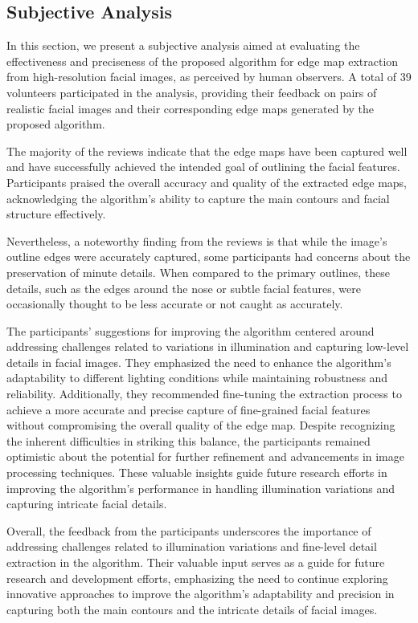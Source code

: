 \documentclass{70_styles/svproc}
\begin{document}
\subsection{Subjective Analysis}

In this section, we present a subjective analysis aimed at evaluating the effectiveness and preciseness of the proposed algorithm for edge map extraction from high-resolution facial images, as perceived by human observers. A total of 39 volunteers participated in the analysis, providing their feedback on pairs of realistic facial images and their corresponding edge maps generated by the proposed algorithm.

The majority of the reviews indicate that the edge maps have been captured well and have successfully achieved the intended goal of outlining the facial features. Participants praised the overall accuracy and quality of the extracted edge maps, acknowledging the algorithm's ability to capture the main contours and facial structure effectively.

Nevertheless, a noteworthy finding from the reviews is that while the image's outline edges were accurately captured, some participants had concerns about the preservation of minute details. When compared to the primary outlines, these details, such as the edges around the nose or subtle facial features, were occasionally thought to be less accurate or not caught as accurately.

The participants' suggestions for improving the algorithm centered around addressing challenges related to variations in illumination and capturing low-level details in facial images. They emphasized the need to enhance the algorithm's adaptability to different lighting conditions while maintaining robustness and reliability. Additionally, they recommended fine-tuning the extraction process to achieve a more accurate and precise capture of fine-grained facial features without compromising the overall quality of the edge map. Despite recognizing the inherent difficulties in striking this balance, the participants remained optimistic about the potential for further refinement and advancements in image processing techniques. These valuable insights guide future research efforts in improving the algorithm's performance in handling illumination variations and capturing intricate facial details.

Overall, the feedback from the participants underscores the importance of addressing challenges related to illumination variations and fine-level detail extraction in the algorithm. Their valuable input serves as a guide for future research and development efforts, emphasizing the need to continue exploring innovative approaches to improve the algorithm's adaptability and precision in capturing both the main contours and the intricate details of facial images.
\end{document}
